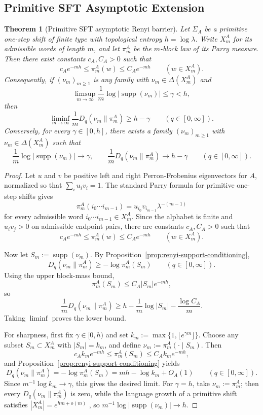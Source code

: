 \documentclass[11pt,letterpaper]{article}
\numberwithin{equation}{section}
\theoremstyle{plain}
\newtheorem{theorem}{Theorem}[section]
\theoremstyle{definition}
\theoremstyle{remark}
\DeclareMathOperator{\supp}{supp}
\begin{document}
\subsection{Primitive SFT Asymptotic Extension}

\begin{theorem}[Primitive SFT asymptotic Renyi barrier]
\label{thm:primitive-sft-renyi-barrier}
Let \(\Sigma_A\) be a primitive one-step shift of finite type with topological
entropy \(h=\log\lambda\). Write \(X_m^A\) for its admissible words of length
\(m\), and let \(\pi_m^A\) be the \(m\)-block law of its Parry measure. Then
there exist constants \(c_A,C_A>0\) such that
\[
c_A e^{-mh}\le \pi_m^A(w)\le C_A e^{-mh}
\qquad (w\in X_m^A).
\]
Consequently, if \((\nu_m)_{m\ge 1}\) is any family with
\(\nu_m\in\Delta(X_m^A)\) and
\[
\limsup_{m\to\infty}\frac{1}{m}\log |\supp(\nu_m)|\le \gamma<h,
\]
then
\[
\liminf_{m\to\infty}\frac{1}{m}D_q(\nu_m\|\pi_m^A)\ge h-\gamma
\qquad (q\in[0,\infty]).
\]
Conversely, for every \(\gamma\in[0,h]\), there exists a family
\((\nu_m)_{m\ge 1}\) with \(\nu_m\in\Delta(X_m^A)\) such that
\[
\frac{1}{m}\log |\supp(\nu_m)|\to \gamma,
\qquad
\frac{1}{m}D_q(\nu_m\|\pi_m^A)\to h-\gamma
\qquad (q\in[0,\infty]).
\]
\end{theorem}

\begin{proof}
Let \(u\) and \(v\) be positive left and right Perron-Frobenius eigenvectors
for \(A\), normalized so that \(\sum_i u_i v_i=1\). The standard Parry formula
for primitive one-step shifts \cite{LindMarcus1995,ParryPollicott1990Zeta}
gives
\[
\pi_m^A(i_0\cdots i_{m-1})=u_{i_0}v_{i_{m-1}}\lambda^{-(m-1)}
\]
for every admissible word \(i_0\cdots i_{m-1}\in X_m^A\). Since the alphabet is
finite and \(u_i v_j>0\) on admissible endpoint pairs, there are constants
\(c_A,C_A>0\) such that
\[
c_A e^{-mh}\le \pi_m^A(w)\le C_A e^{-mh}
\qquad (w\in X_m^A).
\]

Now let \(S_m:=\supp(\nu_m)\). By
Proposition~\ref{prop:renyi-support-conditioning},
\[
D_q(\nu_m\|\pi_m^A)\ge -\log \pi_m^A(S_m)
\qquad (q\in[0,\infty]).
\]
Using the upper block-mass bound,
\[
\pi_m^A(S_m)\le C_A |S_m| e^{-mh},
\]
so
\[
\frac{1}{m}D_q(\nu_m\|\pi_m^A)
\ge
h-\frac{1}{m}\log |S_m|-\frac{\log C_A}{m}.
\]
Taking \(\liminf\) proves the lower bound.

For sharpness, first fix \(\gamma\in[0,h)\) and set
\(k_m:=\max\{1,\lfloor e^{\gamma m}\rfloor\}\). Choose any subset
\(S_m\subset X_m^A\) with \(|S_m|=k_m\), and define
\(\nu_m:=\pi_m^A(\cdot\mid S_m)\). Then
\[
c_A k_m e^{-mh}
\le
\pi_m^A(S_m)
\le
C_A k_m e^{-mh},
\]
and Proposition~\ref{prop:renyi-support-conditioning} yields
\[
D_q(\nu_m\|\pi_m^A)=-\log \pi_m^A(S_m)=mh-\log k_m+O_A(1)
\qquad (q\in[0,\infty]).
\]
Since \(m^{-1}\log k_m\to \gamma\), this gives the desired limit. For
\(\gamma=h\), take \(\nu_m:=\pi_m^A\); then every \(D_q(\nu_m\|\pi_m^A)\) is
zero, while the language growth of a primitive shift satisfies
\(|X_m^A|=e^{hm+o(m)}\) \cite{LindMarcus1995}, so
\(m^{-1}\log |\supp(\nu_m)|\to h\).
\end{proof}
\end{document}
